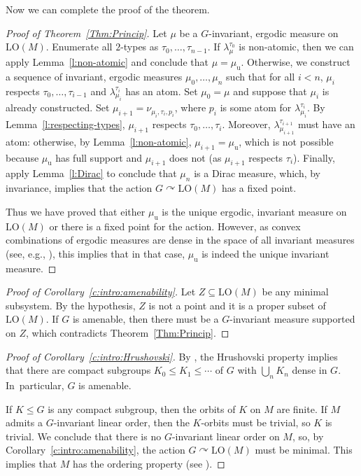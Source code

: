 \documentclass[11pt]{article}
\let\actson\curvearrowright
\let\sub\subseteq
\theoremstyle{plain}
\theoremstyle{definition}
\newcommand{\LO}{\mathrm{LO}}
\newcommand{\muu}{\mu_{\mathrm{u}}}
\begin{document}
Now we can complete the proof of the theorem.
\begin{proof}[Proof of Theorem~\ref{Thm:Princip}]
Let $\mu$ be a $G$-invariant, ergodic measure on $\LO(M)$. Enumerate all $2$-types as $\tau_0, \ldots, \tau_{n-1}$. If $\lambda^{\tau_0}_\mu$ is non-atomic, then we can apply Lemma~\ref{l:non-atomic} and conclude that $\mu = \muu$. Otherwise, we construct a sequence of invariant, ergodic measures $\mu_0, \ldots, \mu_n$ such that for all $i < n$, $\mu_i$ respects $\tau_0, \ldots, \tau_{i-1}$ and $\lambda^{\tau_i}_{\mu_i}$ has an atom. Set $\mu_0 = \mu$ and suppose that $\mu_i$ is already constructed. Set $\mu_{i+1} = \nu_{\mu_i, \tau_i, p_i}$, where $p_i$ is some atom for $\lambda_{\mu_i}^{\tau_i}$. By Lemma~\ref{l:respecting-types}, $\mu_{i+1}$ respects $\tau_0, \ldots, \tau_i$. Moreover, $\lambda_{\mu_{i+1}}^{\tau_{i+1}}$ must have an atom: otherwise, by Lemma~\ref{l:non-atomic}, $\mu_{i+1} = \muu$, which is not possible because $\muu$ has full support and $\mu_{i+1}$ does not (as $\mu_{i+1}$ respects $\tau_i$). Finally, apply Lemma~\ref{l:Dirac} to conclude that $\mu_n$ is a Dirac measure, which, by invariance, implies that the action $G \actson \LO(M)$ has a fixed point.

Thus we have proved that either $\muu$ is the unique ergodic, invariant measure on $\LO(M)$ or there is a fixed point for the action. However, as convex combinations of ergodic measures are dense in the space of all invariant measures (see, e.g., \cite[\S12]{Phelps2001}), this implies that in that case, $\muu$ is indeed the unique invariant measure.
\end{proof}

\begin{proof}[Proof of Corollary~\ref{c:intro:amenability}]
Let $Z \sub \LO(M)$ be any minimal subsystem. By the hypothesis, $Z$ is not a point and it is a proper subset of $\LO(M)$. If $G$ is amenable, then there must be a $G$-invariant measure supported on $Z$, which contradicts Theorem~\ref{Thm:Princip}.
\end{proof}

\begin{proof}[Proof of Corollary~\ref{c:intro:Hrushovski}]
By \cite[Prop.\,6.4]{Kechris2007a}, the Hrushovski property implies that there are compact subgroups $K_0 \leq K_1 \leq \cdots$ of $G$ with $\bigcup_n K_n$ dense in $G$. In~par\-tic\-ular, $G$ is amenable.

If $K \leq G$ is any compact subgroup, then the orbits of $K$ on $M$ are finite. If $M$ admits a $G$-invariant linear order, then the $K$-orbits must be trivial, so $K$ is trivial. We conclude that there is no $G$-invariant linear order on $M$, so, by Corollary~\ref{c:intro:amenability}, the action $G \actson \LO(M)$ must be minimal. This implies that $M$ has the ordering property (see \cite[Th.\,4]{NguyenVanThe2013}).
\end{proof}
\end{document}
